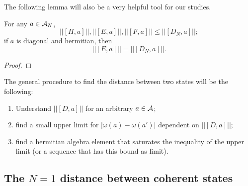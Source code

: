 The following lemma will also be a very helpful tool for our studies.

\begin{lemma}
For any $a \in \mathcal A_N$,
\begin{equation} \label{ineqDN}
    ||[H, a]||, ||[E, a]||, ||[F, a]||  \leq ||[D_N, a]||;
\end{equation} \label{eqDNdiag}
if $a$ is diagonal and hermitian, then
\begin{equation}
    ||[E, a]|| = ||[D_N, a]||.
\end{equation}
\end{lemma}

\begin{proof}

\end{proof}

The general procedure to find the distance between two states will be the following: 

    \begin{enumerate}
    
    \item Understand $||[D, a]||$ for an arbitrary $a \in \mathcal A$; 
    
    \item find a small upper limit for $|\omega(a) - \omega(a')|$ dependent on $||[D, a]||$;
    
    \item find a hermitian algebra element that saturates the inequality of the upper limit (or a sequence that has this bound as limit).
    
    \end{enumerate} 


\subsection{The $N=1$ distance between coherent states}

